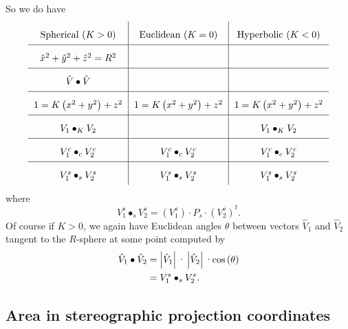 So we do have%
\[%
{\renewcommand{\arraystretch}{2}
\begin{tabular}
[c]{c|c|c}%
Spherical ($K>0$) & Euclidean ($K=0$) & Hyperbolic ($K<0$)\\\hline
$\hat{x}^{2}+\hat{y}^{2}+\hat{z}^{2}=R^{2}$ &  & \\\hline
$\hat{V}\bullet\hat{V}$ &  & \\\hline
$1=K\left(  x^{2}+y^{2}\right)  +z^{2}$ & $1=K\left(  x^{2}+y^{2}\right)
+z^{2}$ & $1=K\left(  x^{2}+y^{2}\right)  +z^{2}$\\\hline
$V_{1}\bullet_{K}V_{2}$ &  & $V_{1}\bullet_{K}V_{2}$\\\hline
$V_{1}^{c}\bullet_{c}V_{2}^{c}$ & $V_{1}^{c}\bullet_{c}V_{2}^{c}$ & $V_{1}%
^{c}\bullet_{c}V_{2}^{c}$\\\hline
$V_{1}^{s}\bullet_{s}V_{2}^{s}$ & $V_{1}^{s}\bullet_{s}V_{2}^{s}$ & $V_{1}%
^{s}\bullet_{s}V_{2}^{s}$%
\end{tabular}}
\]
where%
\[
V_{1}^{s}\bullet_{s}V_{2}^{s}=\left(  V_{1}^{s}\right)  \cdot P_{s}%
\cdot\left(  V_{2}^{s}\right)  ^{t}.
\]
Of course if $K>0$, we again have Euclidean angles $\theta$ between vectors
$\hat{V}_{1}$ and $\hat{V}_{2}$ tangent to the $R$-sphere at some point
computed by%
\begin{align*}
\hat{V}_{1}\bullet\hat{V}_{2}  &  =\left\vert \hat{V}_{1}\right\vert
\text{\textperiodcentered}\left\vert \hat{V}_{2}\right\vert
\text{\textperiodcentered\textrm{cos}}\left(  \theta\right) \\
&  =V_{1}^{s}\bullet_{s}V_{2}^{s}.
\end{align*}


\subsection*{Area in stereographic projection coordinates}

